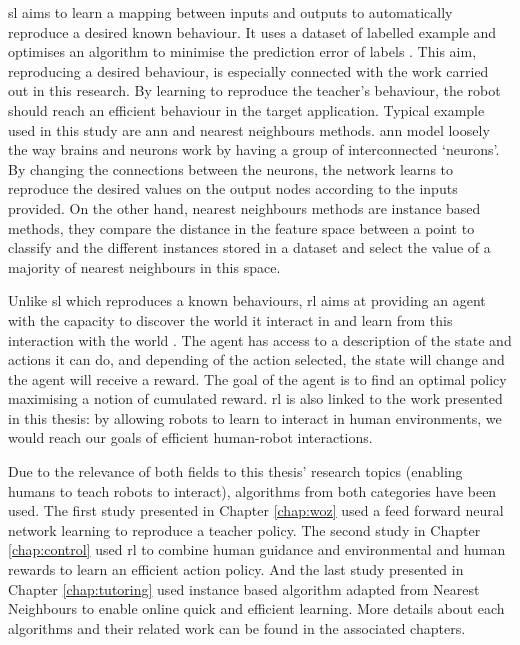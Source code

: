 \gls{sl} aims to learn a mapping between inputs and outputs to automatically reproduce a desired known behaviour. It uses a dataset of labelled example and optimises an algorithm to minimise the prediction error of labels \citep{russell2016artificial}. This aim, reproducing a desired behaviour, is especially connected with the work carried out in this research. By learning to reproduce the teacher's behaviour, the robot should reach an efficient behaviour in the target application. Typical example used in this study are \gls{ann} and nearest neighbours methods. \gls{ann} model loosely the way brains and neurons work by having a group of interconnected `neurons'. By changing the connections between the neurons, the network learns to reproduce the desired values on the output nodes according to the inputs provided. On the other hand, nearest neighbours methods are instance based methods, they compare the distance in the feature space between a point to classify and the different instances stored in a dataset and select the value of a majority of nearest neighbours in this space.

Unlike \gls{sl} which reproduces a known behaviours, \gls{rl} aims at providing an agent with the capacity to discover the world it interact in and learn from this interaction with the world \citep{sutton1998reinforcement}. The agent has access to a description of the state and actions it can do, and depending of the action selected, the state will change and the agent will receive a reward. The goal of the agent is to find an optimal policy maximising a notion of cumulated reward. \gls{rl} is also linked to the work presented in this thesis: by allowing robots to learn to interact in human environments, we would reach our goals of efficient human-robot interactions.

Due to the relevance of both fields to this thesis' research topics (enabling humans to teach robots to interact), algorithms from both categories have been used. The first study presented in Chapter \ref{chap:woz} used a feed forward neural network learning to reproduce a teacher policy. The second study in Chapter \ref{chap:control} used \gls{rl} to combine human guidance and environmental and human rewards to learn an efficient action policy. And the last study presented in Chapter \ref{chap:tutoring} used instance based algorithm adapted from Nearest Neighbours to enable online quick and efficient learning. More details about each algorithms and their related work can be found in the associated chapters.


